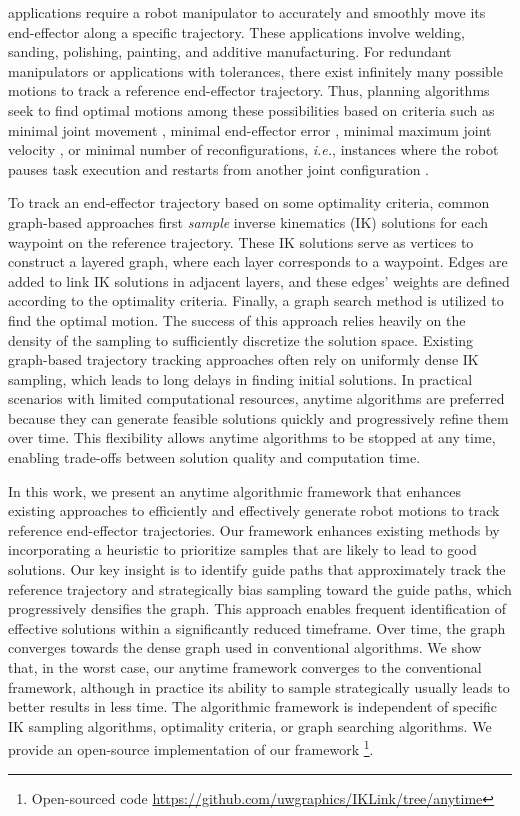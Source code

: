  applications require a robot manipulator to accurately and smoothly move its end-effector along a specific trajectory. These applications involve welding, sanding, polishing, painting, and additive manufacturing. For redundant manipulators or applications with tolerances, there exist infinitely many possible motions to track a reference end-effector trajectory. Thus, planning algorithms seek to find optimal motions among these possibilities based on criteria such as minimal joint movement \cite{rakita2019stampede}, minimal end-effector error \cite{rakita2019stampede,holladay2019minimizing},  minimal maximum joint velocity \cite{morgan2024cppflow}, or minimal number of reconfigurations, \textit{i.e.}, instances where the robot pauses task execution and restarts from another joint configuration \cite{wang2024iklink,yang2022optimal}. 

To track an end-effector trajectory based on some optimality criteria, common graph-based approaches \cite{rakita2019stampede,morgan2024cppflow,wang2024iklink, Descartes,niyaz2020following}   first \textit{sample} inverse kinematics (IK) solutions for each waypoint on the reference trajectory. These IK solutions serve as vertices to construct a layered graph, where each layer corresponds to a waypoint. Edges are added to link IK solutions in adjacent layers, and these edges' weights are defined according to the optimality criteria. Finally, a graph search method is utilized to find the optimal motion. The success of this approach relies heavily on the density of the sampling to sufficiently discretize the solution space. Existing graph-based trajectory tracking approaches often rely on uniformly dense IK sampling, which leads to long delays in finding initial solutions. In practical scenarios with limited computational resources, anytime algorithms are preferred because they can generate feasible solutions quickly and progressively refine them over time. This flexibility allows anytime algorithms to be stopped at any time, enabling trade-offs between solution quality and computation time.

In this work, we present an anytime algorithmic framework that enhances existing approaches to efficiently and effectively generate robot motions to track reference end-effector trajectories. 
Our framework enhances existing methods by incorporating a heuristic to prioritize samples that are likely to lead to good solutions. 
Our key insight is to identify guide paths that approximately track the reference trajectory and strategically bias sampling toward the guide paths, which progressively densifies the graph.  This approach enables frequent identification of effective solutions within a significantly reduced timeframe. Over time, the graph converges towards the dense graph used in conventional algorithms. 
We show that, in the worst case,  our anytime framework converges to the conventional framework, although in practice its ability to sample strategically usually leads to better results in less time.
The algorithmic framework is independent of specific IK sampling algorithms, optimality criteria, or graph searching algorithms. We provide an open-source implementation of our framework
\footnote{Open-sourced code \url{https://github.com/uwgraphics/IKLink/tree/anytime}}.

